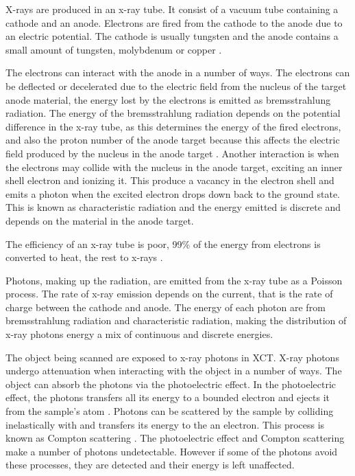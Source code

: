 X-rays \citep{rontgen1896on} are produced in an x-ray tube. It consist of a vacuum tube containing a cathode and an anode. Electrons are fired from the cathode to the anode due to an electric potential. The cathode is usually tungsten and the anode contains a small amount of tungsten, molybdenum or copper \citep{sun2012overview}.

The electrons can interact with the anode in a number of ways. The electrons can be deflected or decelerated due to the electric field from the nucleus of the target anode material, the energy lost by the electrons is emitted as bremsstrahlung radiation. The energy of the bremsstrahlung radiation depends on the potential difference in the x-ray tube, as this determines the energy of the fired electrons, and also the proton number of the anode target because this affects the electric field produced by the nucleus in the anode target \citep{sun2012overview}. Another interaction is when the electrons may collide with the nucleus in the anode target, exciting an inner shell electron and ionizing it. This produce a vacancy in the electron shell and emits a photon when the excited electron drops down back to the ground state. This is known as characteristic radiation and the energy emitted is discrete and depends on the material in the anode target.

The efficiency of an x-ray tube is poor, 99\% of the energy from electrons is converted to heat, the rest to x-rays \citep{kruth2011computed}.

Photons, making up the radiation, are emitted from the x-ray tube as a Poisson process. The rate of x-ray emission depends on the current, that is the rate of charge between the cathode and anode. The energy of each photon are from bremsstrahlung radiation and characteristic radiation, making the distribution of x-ray photons energy a mix of continuous and discrete energies.

The object being scanned are exposed to x-ray photons in XCT. X-ray photons undergo attenuation when interacting with the object in a number of ways. The object can absorb the photons via the photoelectric effect. In the photoelectric effect, the photons transfers all its energy to a bounded electron and ejects it from the sample's atom \citep{millikan1916direct}. Photons can be scattered by the sample by colliding inelastically with and transfers its energy to the an electron. This process is known as Compton scattering \citep{compton1923quantum}. The photoelectric effect and Compton scattering make a number of photons undetectable. However if some of the photons avoid these processes, they are detected and their energy is left unaffected.

